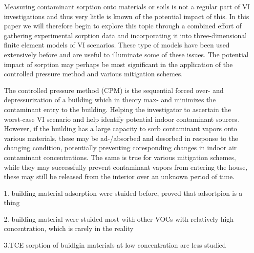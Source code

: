 Measuring contaminant sorption onto materials or soils is not a regular part of VI investigations and thus very little is known of the potential impact of this.
In this paper we will therefore begin to explore this topic through a combined effort of gathering experimental sorption data and incorporating it into three-dimensional finite element models of VI scenarios.
These type of models have been used extensively before and are useful to illuminate some of these issues.
The potential impact of sorption may perhaps be most significant in the application of the controlled pressure method and various mitigation schemes.\par

The controlled pressure method (CPM) is the sequential forced over- and depressurization of a building which in theory max- and minimizes the contaminant entry to the building.
Helping the investigator to ascertain the worst-case VI scenario and help identify potential indoor contaminant sources.
However, if the building has a large capacity to sorb contaminant vapors onto various materials, these may be ad-/absorbed and desorbed in response to the changing condition, potentially preventing coresponding changes in indoor air contaminant concentrations.
The same is true for various mitigation schemes, while they may successfully prevent contaminant vapors from entering the house, these may still be released from the interior over an unknown period of time.\par


1. building material adsorption were stuided before, proved that adsortpion is a thing

2. building material were stuided most with other VOCs with relatively high concentration, which is rarely in the reality 

3.TCE sorption of buidlgin materials at low concentration are less studied













